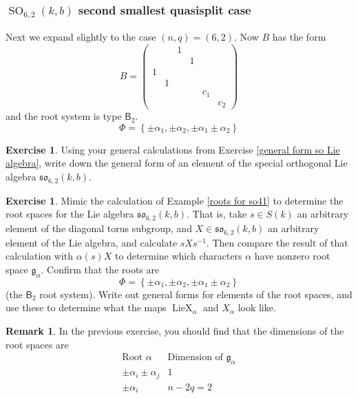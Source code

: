 \documentclass[12pt]{article}
\theoremstyle{definition}
\newtheorem{remark}[theorem]{Remark}
\newtheorem{exercise}[theorem]{Exercise}
\numberwithin{theorem}{subsection}
\newcommand{\lb}{\left\{}
\newcommand{\rb}{\right\}}
\newcommand{\inv}{^{-1}}
\newcommand{\frakg}{\mathfrak{g}}
\newcommand{\frakso}{\mathfrak{so}}
\DeclareMathOperator{\SO}{SO}
\DeclareMathOperator{\LieX}{LieX}
\begin{document}
\subsubsection{$\SO_{6,2}(k,b)$ second smallest quasisplit case}

Next we expand slightly to the case $(n,q) = (6,2)$. Now $B$ has the form
\[
	B =
	\begin{pmatrix}
		&& 1 \\
		&&& 1 \\
		1 \\
		& 1 \\
		&&&& c_1 \\
		&&&&& c_2
	\end{pmatrix}
\]
and the root system is type $\mathsf{B}_2$.
\[
	\Phi = \lb \pm \alpha_1, \pm \alpha_2, \pm \alpha_1 \pm \alpha_2 \rb
\]

\begin{exercise}
\label{62 so Lie algebra}
Using your general calculations from Exercise \ref{general form so Lie algebra}, write down the general form of an element of the special orthogonal Lie algebra $\frakso_{6,2}(k,b)$.
\end{exercise}

\begin{exercise}
\label{62 so root spaces}
Mimic the calculation of Example \ref{roots for so41} to determine the root spaces for the Lie algebra $\frakso_{6,2}(k,b)$. That is, take $s \in S(k)$ an arbitrary element of the diagonal torus subgroup, and $X \in \frakso_{6,2}(k,b)$ an arbitrary element of the Lie algebra, and calculate $sXs \inv$. Then compare the result of that calculation with $\alpha(s) X$ to determine which characters $\alpha$ have nonzero root space $\frakg_\alpha$. Confirm that the roots are
\[
	\Phi = \lb \pm \alpha_1, \pm \alpha_2, \pm \alpha_1 \pm \alpha_2 \rb
\]
(the $\mathsf{B}_2$ root system). Write out general forms for elements of the root spaces, and use these to determine what the maps $\LieX_\alpha$ and $X_\alpha$ look like.
\end{exercise}

\begin{remark}
In the previous exercise, you should find that the dimensions of the root spaces are
\[
	\begin{array}{c|c}
		\text{Root } \alpha & \text{Dimension of } \frakg_\alpha \\
		\hline
		\pm \alpha_i \pm \alpha_j & 1 \\
		\pm \alpha_i & n-2q = 2
	\end{array}
\]
\end{remark}
\end{document}

